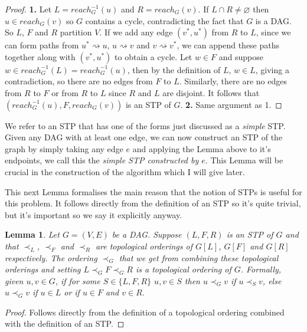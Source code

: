 \documentclass{report}
\newtheorem{lemma}[theorem]{Lemma}
\begin{document}
\begin{proof}
\textbf{1.} Let $L=reach_{G}^{-1}(u)$ and $R=reach_{G}(v)$. If $L \cap R \neq \varnothing$ then $u \in reach_{G}(v)$ so $G$ contains a cycle, contradicting the fact that $G$ is a DAG. So $L$, $F$ and $R$ partition $V$. If we add any edge $(v^{*},u^{*})$ from $R$ to $L$, since we can form paths from $u^{*} \rightsquigarrow u$, $u \rightsquigarrow v$ and $v \rightsquigarrow v^{*}$, we can append these paths together along with $(v^{*},u^{*})$ to obtain a cycle. Let $w \in F$ and suppose $w \in reach_{G}^{-1}(L) = reach_{G}^{-1}(u)$, then by the definition of $L$, $w \in L$, giving a contradiction, so there are no edges from $F$ to $L$. Similarly, there are no edges from $R$ to $F$ or from $R$ to $L$ since $R$ and $L$ are disjoint. It follows that $(reach_{G}^{-1}(u),F,reach_{G}(v))$ is an STP of $G$.
\textbf{2.} Same argument as 1.
\end{proof}

We refer to an STP that has one of the forms just discussed as a \textit{simple} STP. Given any DAG with at least one edge, we can now construct an STP of the graph by simply taking any edge $e$ and applying the Lemma above to it's endpoints, we call this the \textit{simple STP constructed by $e$}. This Lemma will be crucial in the construction of the algorithm which I will give later.

This next Lemma formalises the main reason that the notion of STPs is useful for this problem. It follows directly from the definition of an STP so it's quite trivial, but it's important so we say it explicitly anyway.

\begin{lemma}
Let $G=(V,E)$ be a DAG. Suppose $(L,F,R)$ is an STP of $G$ and that $\prec_{L}$, $\prec_{F}$ and $\prec_{R}$ are topological orderings of $G[L]$, $G[F]$ and $G[R]$ respectively. The ordering $\prec_{G}$ that we get from combining these topological orderings and setting $L \prec_{G} F \prec_{G} R$ is a topological ordering of $G$. Formally, given $u, v \in G$, if for some $S \in \{ L,F,R\}$ $u,v \in S$ then $u \prec_{G} v$ if $u \prec_{S} v$, else $u \prec_{G} v$ if $u \in L$ or if $u \in F$ and $v \in R$. 
\end{lemma}

\begin{proof}
Follows directly from the definition of a topological ordering combined with the definition of an STP.
\end{proof}

\end{document}
